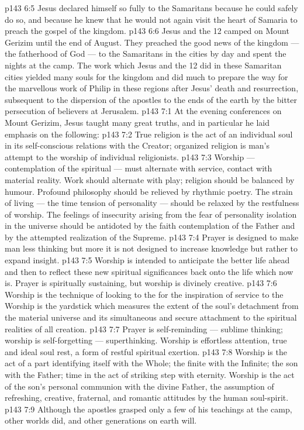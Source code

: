 \vs p143 6:5 Jesus declared himself so fully to the Samaritans because he could safely do so, and because he knew that he would not again visit the heart of Samaria to preach the gospel of the kingdom.
\vs p143 6:6 Jesus and the 12 camped on Mount Gerizim until the end of August. They preached the good news of the kingdom --- the fatherhood of God --- to the Samaritans in the cities by day and spent the nights at the camp. The work which Jesus and the 12 did in these Samaritan cities yielded many souls for the kingdom and did much to prepare the way for the marvellous work of Philip in these regions after Jesus’ death and resurrection, subsequent to the dispersion of the apostles to the ends of the earth by the bitter persecution of believers at Jerusalem.
\vs p143 7:1 At the evening conferences on Mount Gerizim, Jesus taught many great truths, and in particular he laid emphasis on the following:
\vs p143 7:2 \pc True religion is the act of an individual soul in its self\hyp{}conscious relations with the Creator; organized religion is man’s attempt to  the worship of individual religionists.
\vs p143 7:3 \pc Worship --- contemplation of the spiritual --- must alternate with service, contact with material reality. Work should alternate with play; religion should be balanced by humour. Profound philosophy should be relieved by rhythmic poetry. The strain of living --- the time tension of personality --- should be relaxed by the restfulness of worship. The feelings of insecurity arising from the fear of personality isolation in the universe should be antidoted by the faith contemplation of the Father and by the attempted realization of the Supreme.
\vs p143 7:4 \pc Prayer is designed to make man less thinking but more  it is not designed to increase knowledge but rather to expand insight.
\vs p143 7:5 \pc Worship is intended to anticipate the better life ahead and then to reflect these new spiritual significances back onto the life which now is. Prayer is spiritually sustaining, but worship is divinely creative.
\vs p143 7:6 \pc Worship is the technique of looking to the  for the inspiration of service to the  Worship is the yardstick which measures the extent of the soul’s detachment from the material universe and its simultaneous and secure attachment to the spiritual realities of all creation.
\vs p143 7:7 \pc Prayer is self\hyp{}reminding --- sublime thinking; worship is self\hyp{}forgetting --- superthinking. Worship is effortless attention, true and ideal soul rest, a form of restful spiritual exertion.
\vs p143 7:8 \pc Worship is the act of a part identifying itself with the Whole; the finite with the Infinite; the son with the Father; time in the act of striking step with eternity. Worship is the act of the son’s personal communion with the divine Father, the assumption of refreshing, creative, fraternal, and romantic attitudes by the human soul\hyp{}spirit.
\vs p143 7:9 \pc Although the apostles grasped only a few of his teachings at the camp, other worlds did, and other generations on earth will.
